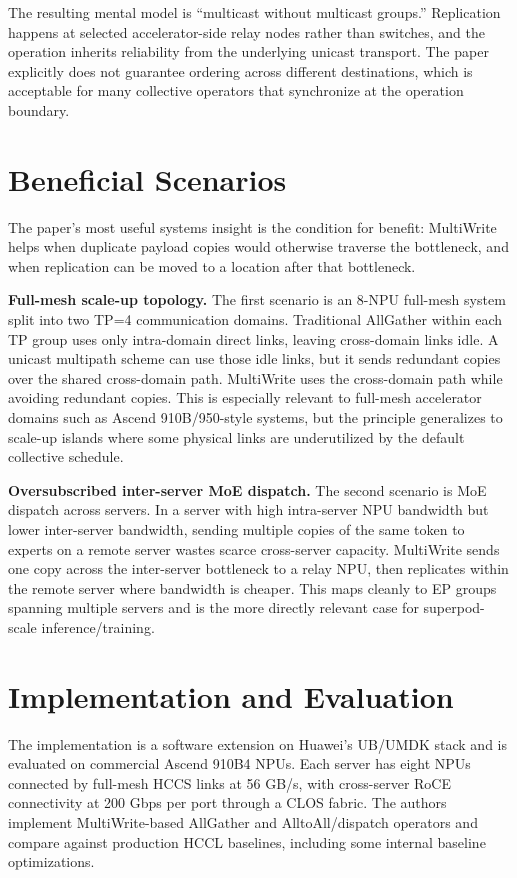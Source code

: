 \documentclass[10pt]{article}
\begin{document}
The resulting mental model is ``multicast without multicast groups.'' Replication happens at selected accelerator-side relay nodes rather than switches, and the operation inherits reliability from the underlying unicast transport. The paper explicitly does not guarantee ordering across different destinations, which is acceptable for many collective operators that synchronize at the operation boundary.

\section{Beneficial Scenarios}

The paper's most useful systems insight is the condition for benefit: MultiWrite helps when duplicate payload copies would otherwise traverse the bottleneck, and when replication can be moved to a location after that bottleneck.

\textbf{Full-mesh scale-up topology.} The first scenario is an 8-NPU full-mesh system split into two TP=4 communication domains. Traditional AllGather within each TP group uses only intra-domain direct links, leaving cross-domain links idle. A unicast multipath scheme can use those idle links, but it sends redundant copies over the shared cross-domain path. MultiWrite uses the cross-domain path while avoiding redundant copies. This is especially relevant to full-mesh accelerator domains such as Ascend 910B/950-style systems, but the principle generalizes to scale-up islands where some physical links are underutilized by the default collective schedule.

\textbf{Oversubscribed inter-server MoE dispatch.} The second scenario is MoE dispatch across servers. In a server with high intra-server NPU bandwidth but lower inter-server bandwidth, sending multiple copies of the same token to experts on a remote server wastes scarce cross-server capacity. MultiWrite sends one copy across the inter-server bottleneck to a relay NPU, then replicates within the remote server where bandwidth is cheaper. This maps cleanly to EP groups spanning multiple servers and is the more directly relevant case for superpod-scale inference/training.

\section{Implementation and Evaluation}

The implementation is a software extension on Huawei's UB/UMDK stack and is evaluated on commercial Ascend 910B4 NPUs. Each server has eight NPUs connected by full-mesh HCCS links at 56 GB/s, with cross-server RoCE connectivity at 200 Gbps per port through a CLOS fabric. The authors implement MultiWrite-based AllGather and AlltoAll/dispatch operators and compare against production HCCL baselines, including some internal baseline optimizations.
\end{document}
